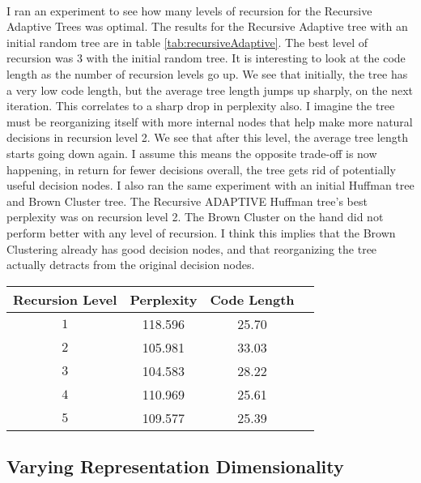 \documentclass[12pt]{ociamthesis}  %
\newcommand{\ra}[1]{\renewcommand{\arraystretch}{#1}}
\begin{document}
\paragraph{}
I ran an experiment to see how many levels of recursion for the Recursive Adaptive Trees was optimal. The results for the Recursive Adaptive tree with an initial random tree are in table \ref{tab:recursiveAdaptive}. The best level of recursion was 3 with the initial random tree. It is interesting to look at the code length as the number of recursion levels go up. We see that initially, the tree has a very low code length, but the average tree length jumps up sharply, on the next iteration. This correlates to a sharp drop in perplexity also. I imagine the tree must be reorganizing itself with more internal nodes that help make more natural decisions in recursion level 2. We see that after this level, the average tree length starts going down again. I assume this means the opposite trade-off is now happening, in return for fewer decisions overall, the tree gets rid of potentially useful decision nodes. I also ran the same experiment with an initial Huffman tree and Brown Cluster tree. The Recursive ADAPTIVE Huffman tree's best perplexity was on recursion level 2. The Brown Cluster on the hand did not perform better with any level of recursion. I think this implies that the Brown Clustering already has good decision nodes, and that reorganizing the tree actually detracts from the original decision nodes.
\begin{table*} \centering
\ra{1.3}
\begin{tabular}{@{}cccc@{}}\toprule
Recursion Level & Perplexity & Code Length\\ 
\midrule
$1$ & 118.596 & 25.70\\
$2$ & 105.981 & 33.03\\
$3$ & 104.583 & 28.22\\
$4$ & 110.969 & 25.61\\
$5$ & 109.577 & 25.39\\
\bottomrule
\end{tabular}
\caption{The effect of more recursion levels on the Recursive ADAPTIVE tree with an initial random tree}
\label{tab:recursiveAdaptive}
\end{table*}

\subsection{Varying Representation Dimensionality}
\end{document}
